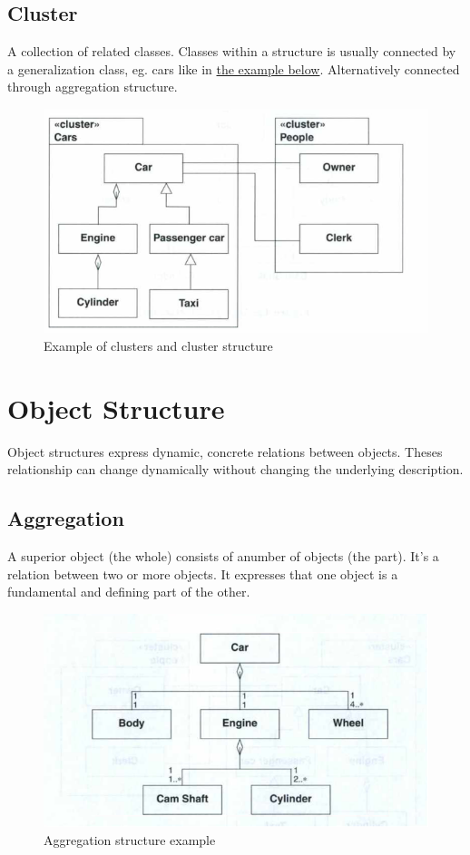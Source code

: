 \subsection*{Cluster}
A collection of related classes. Classes within a structure is usually connected by a generalization class, eg. cars like in \href{fig:structure_cluster_example}{the example below}. Alternatively connected through aggregation structure.
\begin{figure}[H]
    \center
    \includegraphics[width=\linewidth*3/4]{chapters/structure/figures/cluster_example.png}
    \caption{Example of clusters and cluster structure \ooad[77]}
    \label{fig:structure_cluster_example}
\end{figure}

\section{Object Structure}
Object structures express dynamic, concrete relations between objects. Theses relationship can change dynamically without changing the underlying description.

\subsection*{Aggregation}
A superior object (the whole) consists of anumber of objects (the part). It's a relation between two or more objects. It expresses that one object is a fundamental and defining part of the other.
\begin{figure}[H]
    \center
    \includegraphics[width=\linewidth*3/4]{chapters/structure/figures/aggregation_structure.png}
    \caption{Aggregation structure example \ooad[78]}
    \label{fig:structure_aggregation_example}
\end{figure}
